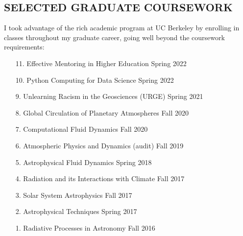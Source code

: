 \documentclass[margin, 10pt]{res} %
\begin{document}
\begin{resume}



\section{SELECTED GRADUATE COURSEWORK}

I took advantage of the rich academic program at UC Berkeley by enrolling in classes throughout my graduate career, going well beyond the coursework requirements:

\begin{enumerate}
	
	\item[11.] Effective Mentoring in Higher Education \hfill Spring 2022
	
	\item[10.] Python Computing for Data Science \hfill Spring 2022
	
	\item[9.] Unlearning Racism in the Geosciences (URGE) \hfill Spring 2021
	
	\item[8.] Global Circulation of Planetary Atmospheres \hfill Fall 2020
	
	\item[7.] Computational Fluid Dynamics \hfill Fall 2020
	
	\item[6.] Atmospheric Physics and Dynamics (audit) \hfill Fall 2019
	
	\item[5.] Astrophysical Fluid Dynamics \hfill Spring 2018
	
	\item[4.] Radiation and its Interactions with Climate \hfill Fall 2017
	
	\item[3.] Solar System Astrophysics \hfill Fall 2017
	
	\item[2.] Astrophysical Techniques \hfill Spring 2017
	
	\item[1.] Radiative Processes in Astronomy \hfill Fall 2016
	

\end{enumerate}
\end{resume}
\end{document}
